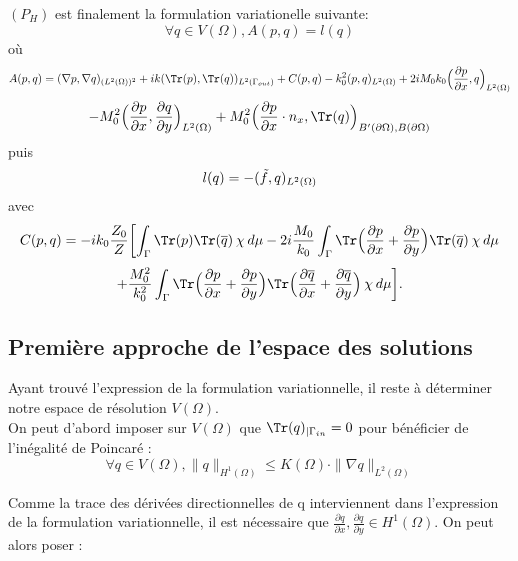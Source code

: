 \begin{tcolorbox}[colback=green!5!white,colframe=green!75!black,title=Théorème 4.1.2: Formulation variationnelle]
$(P_H)$ est finalement la formulation variationelle suivante:
\begin{equation}
\label{eq:FV}
\forall q\in V(\Omega), A(p,q) = l(q)
\end{equation}
où
\[A(p,q) = (\nabla p, \nabla q)_{(L^2(\Omega))^2} + ik(\Tr(p),\Tr(q))_{L^2(\Gamma_{out})} + C(p,q) -k_0^2(p,q)_{L^2(\Omega)} + 2iM_0k_0\Big(\frac{\partial p}{\partial x}, q\Big)_{L^2(\Omega)} \]
\[-M_0^2\Big(\frac{\partial p}{\partial x},\frac{\partial q}{\partial y}\Big)_{L^2(\Omega)}+ M_0^2\Big(\frac{\partial p}{\partial x}\cdot n_x,\Tr(q)\Big)_{B'(\partial \Omega),B(\partial \Omega)}\]
puis
\[l(q) = -(\Tilde{f},q)_{L^2(\Omega)}\]
avec
\[C(p,q) = -ik_0\frac{Z_0}{Z} \biggl[ \int_{\Gamma} \Tr(p) \Tr(\overline{q}) \hspace{2pt} \chi \hspace{2pt} d\mu - 2i\frac{M_0}{k_0} \int_{\Gamma} \Tr \Bigl( \frac{\partial p}{\partial x}+\frac{\partial p}{\partial y} \Bigr) \Tr(\overline{q}) \hspace{2pt} \chi \hspace{2pt} d\mu\]
\[+ \frac{M_0^2}{k_0^2}\int_{\Gamma} \Tr \Bigl( \frac{\partial p}{\partial x}+\frac{\partial p}{\partial y}\Bigr)\Tr\Bigl( \frac{\partial \overline{q}}{\partial x}+\frac{\partial \overline{q}}{\partial y}\Bigr) \hspace{2pt} \chi  \hspace{2pt} d\mu \biggl].\]
\end{tcolorbox}
\subsection{Première approche de l'espace des solutions}

Ayant trouvé l'expression de la formulation variationnelle, il reste à déterminer notre espace de résolution $V(\Omega)$. \\
On peut d'abord imposer sur $V(\Omega)$ que $\displaystyle \Tr(q)_{|\Gamma_{in}} = 0$ pour bénéficier de l'inégalité de Poincaré :
\[\forall q\in V(\Omega), \|q\|_{H^1(\Omega)} \leq K(\Omega)\cdot \|\nabla q\|_{L^2(\Omega)}\]

Comme la trace des dérivées directionnelles de q interviennent dans l'expression de la formulation variationnelle, il est nécessaire que $\displaystyle \frac{\partial q}{\partial x},\frac{\partial q}{\partial y}\in H^1(\Omega)$. On peut alors poser :

